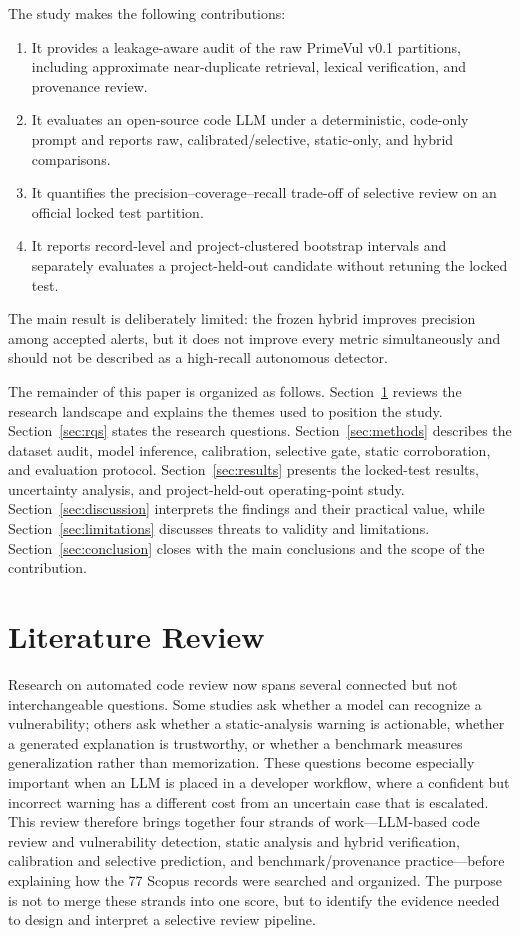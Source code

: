\documentclass[pdflatex,sn-mathphys-num]{sn-jnl}
\begin{document}
The study makes the following contributions:
\begin{enumerate}[leftmargin=*]
\item It provides a leakage-aware audit of the raw PrimeVul v0.1 partitions, including approximate near-duplicate retrieval, lexical verification, and provenance review.
\item It evaluates an open-source code LLM under a deterministic, code-only prompt and reports raw, calibrated/selective, static-only, and hybrid comparisons.
\item It quantifies the precision--coverage--recall trade-off of selective review on an official locked test partition.
\item It reports record-level and project-clustered bootstrap intervals and separately evaluates a project-held-out candidate without retuning the locked test.
\end{enumerate}

The main result is deliberately limited: the frozen hybrid improves precision among accepted alerts, but it does not improve every metric simultaneously and should not be described as a high-recall autonomous detector.

The remainder of this paper is organized as follows. Section~\ref{sec:literature} reviews the research landscape and explains the themes used to position the study. Section~\ref{sec:rqs} states the research questions. Section~\ref{sec:methods} describes the dataset audit, model inference, calibration, selective gate, static corroboration, and evaluation protocol. Section~\ref{sec:results} presents the locked-test results, uncertainty analysis, and project-held-out operating-point study. Section~\ref{sec:discussion} interprets the findings and their practical value, while Section~\ref{sec:limitations} discusses threats to validity and limitations. Section~\ref{sec:conclusion} closes with the main conclusions and the scope of the contribution.

\section{Literature Review}\label{sec:literature}

Research on automated code review now spans several connected but not interchangeable questions. Some studies ask whether a model can recognize a vulnerability; others ask whether a static-analysis warning is actionable, whether a generated explanation is trustworthy, or whether a benchmark measures generalization rather than memorization. These questions become especially important when an LLM is placed in a developer workflow, where a confident but incorrect warning has a different cost from an uncertain case that is escalated. This review therefore brings together four strands of work---LLM-based code review and vulnerability detection, static analysis and hybrid verification, calibration and selective prediction, and benchmark/provenance practice---before explaining how the 77 Scopus records were searched and organized. The purpose is not to merge these strands into one score, but to identify the evidence needed to design and interpret a selective review pipeline.
\end{document}
